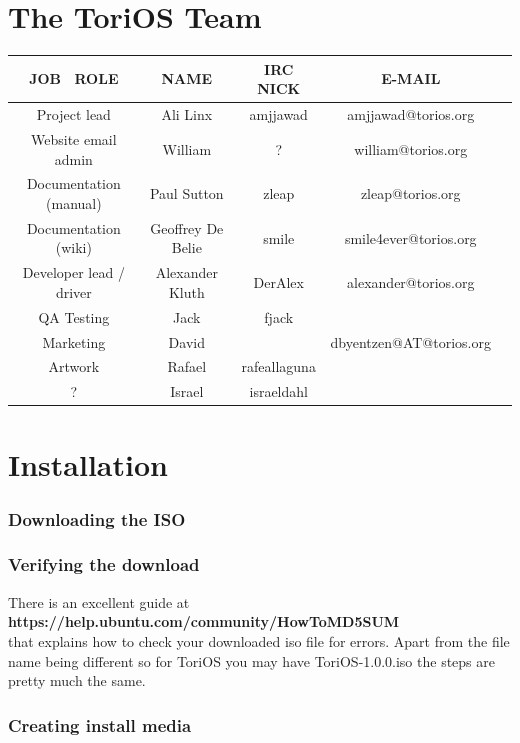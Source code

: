 \documentclass[12pt,a4paper]{book}
\begin{document}
\chapter{The ToriOS Team}

\begin{tabular}{|c|c|c|c|c|}
\hline  \textbf{JOB \ ROLE} & \textbf{NAME}  & \textbf{IRC NICK} & \textbf{E-MAIL}  \\ 
\hline  Project lead & Ali Linx  & amjjawad & amjjawad@torios.org  \\ 
\hline  Website email admin & William  & ? & william@torios.org  \\ 
\hline  Documentation (manual)  & Paul Sutton  & zleap  & zleap@torios.org \\ 
\hline  Documentation (wiki) & Geoffrey De Belie & smile  & smile4ever@torios.org  \\ 
\hline  Developer lead / driver & Alexander Kluth & DerAlex & alexander@torios.org \\ 
\hline  QA Testing & Jack  & fjack  &  \\ 
\hline  Marketing & David &  & dbyentzen@AT@torios.org \\
\hline Artwork & Rafael & rafeallaguna & \\
\hline ? & Israel & israeldahl & \\

\hline 
\end{tabular}


\chapter{Installation}
\subsection{Downloading the ISO}
\subsection{Verifying the download}
There is an excellent guide at\\ \textbf{https://help.ubuntu.com/community/HowToMD5SUM} \\
that explains how to check your downloaded iso file for errors.  Apart from the file name being different so for ToriOS you may have ToriOS-1.0.0.iso the steps are pretty much the same.  
\subsection{Creating install media}
\end{document}
